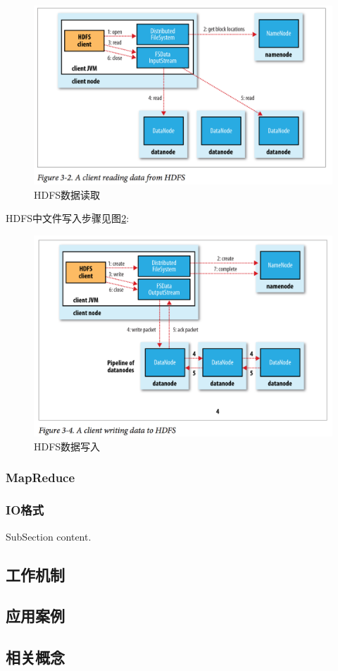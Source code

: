\documentclass{article}
\begin{document}
\begin{figure}
\centering
\includegraphics[scale=0.5]{image/hdfs-read-data.png}
\caption{HDFS数据读取}\label{fig:hdfs-read-data}
\end{figure}

HDFS中文件写入步骤见图\ref{fig:hdfs-write-data}:

\begin{figure}
\centering
\includegraphics[scale=0.5]{image/hdfs-write-data.png}
\caption{HDFS数据写入}\label{fig:hdfs-write-data}
\end{figure}

\subsubsection{MapReduce}

\subsubsection{IO格式}

SubSection content.

\subsection{工作机制}

\subsection{应用案例}

\subsection{相关概念}

\newpage


\newpage
\renewcommand\refname{参考文献}


\newpage
\renewcommand\indexname{索引}
\printindex
\end{document}
